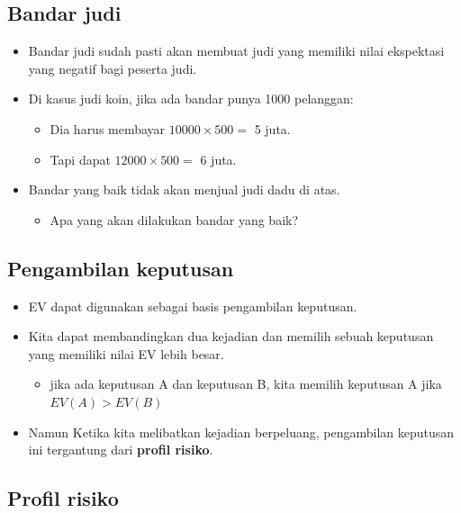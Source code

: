\documentclass[
  letterpaper,
  DIV=11,
  numbers=noendperiod]{scrartcl}
\providecommand{\tightlist}{%
  \setlength{\itemsep}{0pt}\setlength{\parskip}{0pt}}\usepackage{longtable,booktabs,array}
\begin{document}
\hypertarget{bandar-judi}{%
\subsection{Bandar judi}\label{bandar-judi}}

\begin{itemize}
\item
  Bandar judi sudah pasti akan membuat judi yang memiliki nilai
  ekspektasi yang negatif bagi peserta judi.
\item
  Di kasus judi koin, jika ada bandar punya 1000 pelanggan:

  \begin{itemize}
  \item
    Dia harus membayar \(10000 \times 500=\) 5 juta.
  \item
    Tapi dapat \(12000 \times 500=\) 6 juta.
  \end{itemize}
\item
  Bandar yang baik tidak akan menjual judi dadu di atas.

  \begin{itemize}
  \tightlist
  \item
    Apa yang akan dilakukan bandar yang baik?
  \end{itemize}
\end{itemize}

\hypertarget{pengambilan-keputusan}{%
\subsection{Pengambilan keputusan}\label{pengambilan-keputusan}}

\begin{itemize}
\item
  EV dapat digunakan sebagai basis pengambilan keputusan.
\item
  Kita dapat membandingkan dua kejadian dan memilih sebuah keputusan
  yang memiliki nilai EV lebih besar.

  \begin{itemize}
  \tightlist
  \item
    jika ada keputusan A dan keputusan B, kita memilih keputusan A jika
    \(EV(A) > EV(B)\)
  \end{itemize}
\item
  Namun Ketika kita melibatkan kejadian berpeluang, pengambilan
  keputusan ini tergantung dari \textbf{profil risiko}.
\end{itemize}

\hypertarget{profil-risiko}{%
\subsection{Profil risiko}\label{profil-risiko}}
\end{document}
